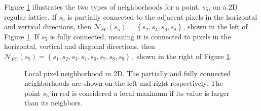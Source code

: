 \documentclass{article}
\begin{document}
Figure \ref{fig0} illustrates the two types of neighborhoods for a point, $s_5$, on a 2D regular lattice. If $s_5$ is partially connected to the adjacent pixels in the horizontal and vertical directions, then $\mathcal{N}_{PC}(s_5) = \left\{s_2,s_4,s_6,s_8\right\}$, shown in the left of Figure \ref{fig0}. If $s_5$ is fully connected, meaning it is connected to pixels in the horizontal, vertical and diagonal directions, then $\mathcal{N}_{FC}(s_5) = \left\{s_1,s_2,s_3,s_4,s_6,s_7,s_8,s_9\right\},$ shown in the right of Figure \ref{fig0}.
\begin{figure}[!htp]
\begin{minipage}{0.5\textwidth}
\centering
{} 
\end{minipage}\hfill
\begin{minipage}{0.5\textwidth}
\centering
{} 
\end{minipage}
\caption{Local pixel neighborhood in 2D. The partially and fully connected neighborhoods are shown on the left and right respectively. The point $s_5$ in red is considered a local maximum if its value is larger than its neighbors.}\label{fig0}
\end{figure}
\end{document}
